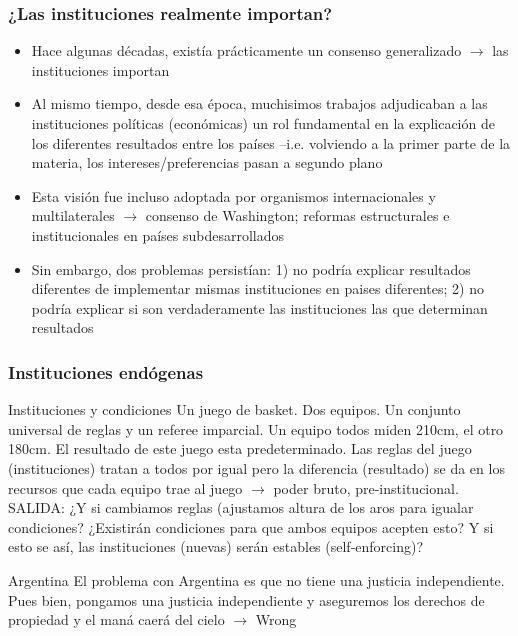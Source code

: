 \documentclass[handout,final,xcolor=dvipsnames]{beamer}
\begin{document}
\begin{frame}\frametitle{¿Las instituciones realmente importan?}
\begin{itemize}\itemsep 15pt
\item Hace algunas décadas, existía prácticamente un consenso
  generalizado $\longrightarrow$ las instituciones importan
  \item Al mismo tiempo, desde esa época, muchisimos trabajos
    adjudicaban a las instituciones políticas (económicas) un rol
    fundamental en la explicación de los diferentes resultados entre
    los países --i.e. volviendo a la primer parte de la materia, los
    intereses/preferencias pasan a segundo plano
    \item Esta visión fue incluso adoptada por organismos
      internacionales y multilaterales $\longrightarrow$ consenso de
      Washington; reformas estructurales e institucionales en países
      subdesarrollados
      \item Sin embargo, dos problemas persistían: 1) no podría
        explicar resultados diferentes de implementar mismas
        instituciones en paises diferentes; 2) no podría explicar si
        son verdaderamente las instituciones las que determinan resultados
\end{itemize}
\end{frame}


\begin{frame}\frametitle{Instituciones endógenas}
  \begin{block}{Instituciones y condiciones}
    Un juego de basket. Dos equipos. Un conjunto universal de reglas y
    un referee imparcial. Un equipo todos miden 210cm, el otro
    180cm. El resultado de este juego esta predeterminado. Las reglas
    del juego (instituciones) tratan a todos por igual pero la
    diferencia (resultado) se da en los recursos que cada equipo trae
    al juego $\longrightarrow$ poder bruto, pre-institucional. SALIDA:
    ¿Y si cambiamos reglas (ajustamos altura de los aros para igualar
    condiciones? ¿Existirán condiciones para que ambos equipos acepten
    esto? Y si esto se así, las instituciones (nuevas) serán estables (self-enforcing)?
    \end{block}
    \begin{block}{Argentina}
El problema con Argentina es que no tiene una justicia
independiente. Pues bien, pongamos una justicia independiente y
aseguremos los derechos de propiedad y el maná caerá del cielo
$\longrightarrow$ Wrong
\end{block}
\end{frame}
\end{document}
